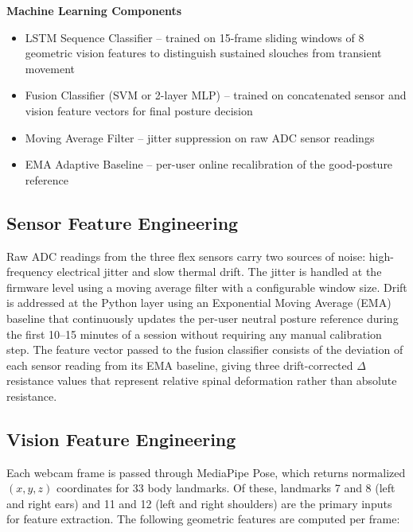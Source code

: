 \documentclass[conference]{IEEEtran}
\begin{document}
\textbf{Machine Learning Components}
\begin{itemize}
    \item LSTM Sequence Classifier -- trained on 15-frame 
    sliding windows of 8 geometric vision features to 
    distinguish sustained slouches from transient movement
    \item Fusion Classifier (SVM or 2-layer MLP) -- trained 
    on concatenated sensor and vision feature vectors for 
    final posture decision
    \item Moving Average Filter -- jitter suppression on 
    raw ADC sensor readings
    \item EMA Adaptive Baseline -- per-user online 
    recalibration of the good-posture reference
\end{itemize}

\subsection{Sensor Feature Engineering}

Raw ADC readings from the three flex sensors carry two 
sources of noise: high-frequency electrical jitter and 
slow thermal drift. The jitter is handled at the firmware 
level using a moving average filter with a configurable 
window size. Drift is addressed at the Python layer using 
an Exponential Moving Average (EMA) baseline that 
continuously updates the per-user neutral posture reference 
during the first 10--15 minutes of a session without 
requiring any manual calibration step. The feature vector 
passed to the fusion classifier consists of the deviation 
of each sensor reading from its EMA baseline, giving 
three drift-corrected $\Delta$resistance values that 
represent relative spinal deformation rather than 
absolute resistance.

\subsection{Vision Feature Engineering}

Each webcam frame is passed through MediaPipe Pose, which 
returns normalized $(x, y, z)$ coordinates for 33 body 
landmarks. Of these, landmarks 7 and 8 (left and right 
ears) and 11 and 12 (left and right shoulders) are the 
primary inputs for feature extraction. The following 
geometric features are computed per frame:
\end{document}

